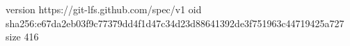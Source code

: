 version https://git-lfs.github.com/spec/v1
oid sha256:e67da2eb03f9c77379dd4f1d47c34d23d88641392de3f751963c44719425a727
size 416
